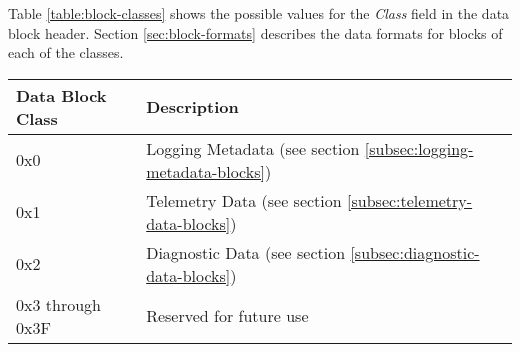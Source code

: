 Table \ref{table:block-classes} shows the possible values for the \emph{Class} field in the data block header. Section
\ref{sec:block-formats} describes the data formats for blocks of each of the classes.

\begin{table*}[htb]
	\centering
	\begin{tabular}{@{}ll@{}}
		\toprule
		Data Block Class & Description                                                         \\
		\midrule
		0x0              & Logging Metadata (see section \ref{subsec:logging-metadata-blocks}) \\
		0x1              & Telemetry Data (see section \ref{subsec:telemetry-data-blocks})     \\
		0x2              & Diagnostic Data (see section \ref{subsec:diagnostic-data-blocks})   \\
		0x3 through 0x3F & Reserved for future use                                             \\
		\bottomrule
	\end{tabular}
	\caption{Data Block Classes}
	\label{table:block-classes}
\end{table*}
